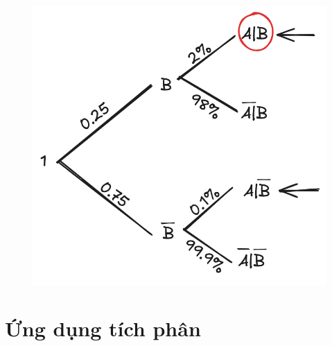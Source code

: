 \documentclass[twoside,final]{hcmut-report}
\begin{document}
\begin{minipage}{0.4\textwidth}
    \begin{figure}[H]
        \centering
        \includegraphics[width=\textwidth]{images/Nghệ An 2025 - Đợt 3/NgheAn25-1.png}
    \end{figure}
\end{minipage}
\newpage\section{Ứng dụng tích phân}
\end{document}
